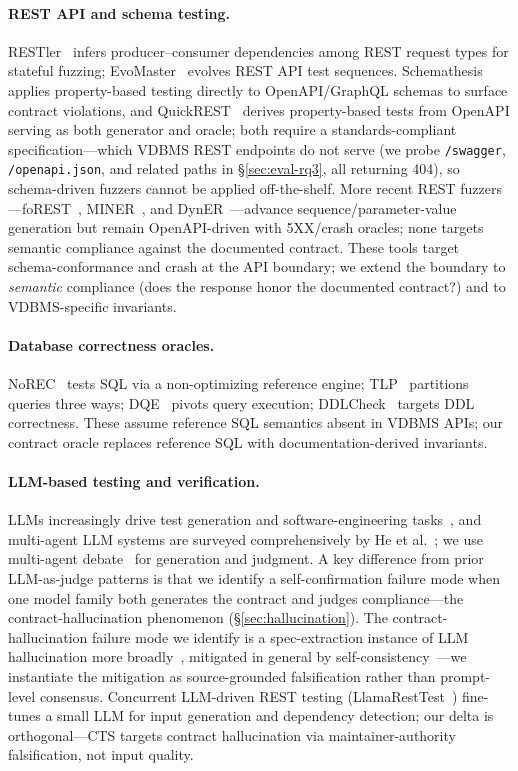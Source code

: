 \documentclass[sigconf]{acmart}
\begin{document}
\paragraph{REST API and schema testing.} RESTler~\cite{restler19} infers producer--consumer dependencies among REST request types for stateful fuzzing; EvoMaster~\cite{evomaster21} evolves REST API test sequences. Schemathesis~\cite{schemathesis} applies property-based testing directly to OpenAPI/GraphQL schemas to surface contract violations, and QuickREST~\cite{quickrest20} derives property-based tests from OpenAPI serving as both generator and oracle; both require a standards-compliant specification---which VDBMS REST endpoints do not serve (we probe \texttt{/swagger}, \texttt{/openapi.json}, and related paths in \S\ref{sec:eval-rq3}, all returning 404), so schema-driven fuzzers cannot be applied off-the-shelf. More recent REST fuzzers---foREST~\cite{lin2023forest}, MINER~\cite{lyu2023miner}, and DynER~\cite{chen2024dyner}---advance sequence/parameter-value generation but remain OpenAPI-driven with 5XX/crash oracles; none targets semantic compliance against the documented contract. These tools target schema-conformance and crash at the API boundary; we extend the boundary to \emph{semantic} compliance (does the response honor the documented contract?) and to VDBMS-specific invariants.
\paragraph{Database correctness oracles.} NoREC~\cite{norec20} tests SQL via a non-optimizing reference engine; TLP~\cite{tlp20} partitions queries three ways; DQE~\cite{dqe20} pivots query execution; DDLCheck~\cite{ddlcheck25} targets DDL correctness. These assume reference SQL semantics absent in VDBMS APIs; our contract oracle replaces reference SQL with documentation-derived invariants.
\paragraph{LLM-based testing and verification.} LLMs increasingly drive test generation and software-engineering tasks~\cite{hou23llmse}, and multi-agent LLM systems are surveyed comprehensively by He et al.~\cite{he2025lma}; we use multi-agent debate~\cite{du2023improving} for generation and judgment. A key difference from prior LLM-as-judge patterns is that we identify a self-confirmation failure mode when one model family both generates the contract and judges compliance---the contract-hallucination phenomenon (\S\ref{sec:hallucination}). The contract-hallucination failure mode we identify is a spec-extraction instance of LLM hallucination more broadly~\cite{ji23hall}, mitigated in general by self-consistency~\cite{wang22sc}---we instantiate the mitigation as source-grounded falsification rather than prompt-level consensus. Concurrent LLM-driven REST testing (LlamaRestTest~\cite{kim2025llamaresttest}) fine-tunes a small LLM for input generation and dependency detection; our delta is orthogonal---CTS targets contract hallucination via maintainer-authority falsification, not input quality.
\end{document}
